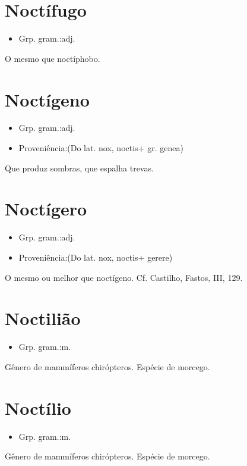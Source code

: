 \section{Noctífugo}
\begin{itemize}
\item {Grp. gram.:adj.}
\end{itemize}
O mesmo que \textunderscore noctíphobo\textunderscore .
\section{Noctígeno}
\begin{itemize}
\item {Grp. gram.:adj.}
\end{itemize}
\begin{itemize}
\item {Proveniência:(Do lat. \textunderscore nox\textunderscore , \textunderscore noctis\textunderscore  + gr. \textunderscore genea\textunderscore )}
\end{itemize}
Que produz sombras, que espalha trevas.
\section{Noctígero}
\begin{itemize}
\item {Grp. gram.:adj.}
\end{itemize}
\begin{itemize}
\item {Proveniência:(Do lat. \textunderscore nox\textunderscore , \textunderscore noctis\textunderscore  + \textunderscore gerere\textunderscore )}
\end{itemize}
O mesmo ou melhor que \textunderscore noctígeno\textunderscore . Cf. Castilho, \textunderscore Fastos\textunderscore , III, 129.
\section{Noctilião}
\begin{itemize}
\item {Grp. gram.:m.}
\end{itemize}
Gênero de mammíferos chirópteros.
Espécie de morcego.
\section{Noctílio}
\begin{itemize}
\item {Grp. gram.:m.}
\end{itemize}
Gênero de mammíferos chirópteros.
Espécie de morcego.
